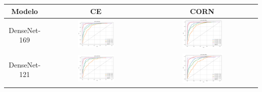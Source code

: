 \begin{table}[!htbp]
    \centering
    \begin{tabular}{|c|c|c|}
        \hline
        \textbf{Modelo} & \textbf{CE} & \textbf{CORN} \\ \hline
        DenseNet-169 & \includegraphics[width=0.38\textwidth]{figs/auc_roc/densenet169_auc_roc_cross_entropy.png} & \includegraphics[width=0.38\textwidth]{figs/auc_roc/densenet169_auc_roc_corn.png} \\ \hline
        DenseNet-121 & \includegraphics[width=0.38\textwidth]{figs/auc_roc/densenet121_auc_roc_cross_entropy.png} & \includegraphics[width=0.38\textwidth]{figs/auc_roc/densenet121_auc_roc_corn.png} \\ \hline

\end{tabular}
\end{table}
